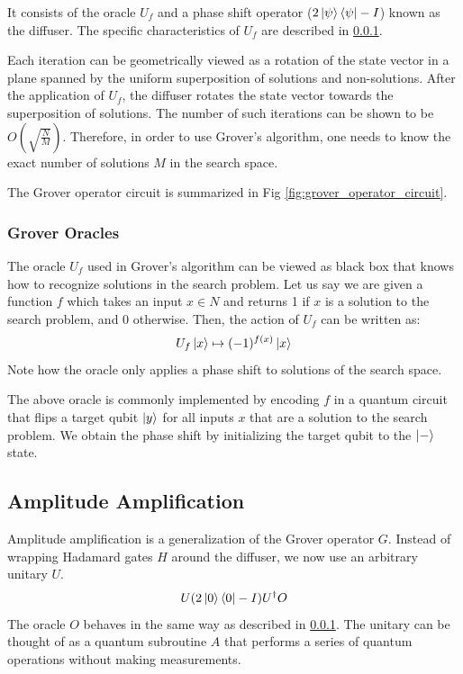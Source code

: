 \documentclass[10pt]{proc}
\theoremstyle{definition}
\theoremstyle{remark}
\begin{document}
It consists of the oracle $U_f$ and a phase shift operator
($2\ket{\psi}\bra{\psi} - I$) known as the diffuser. The specific
characteristics of $U_f$ are described in \ref{sec:grover_oracles}.

Each iteration can be geometrically viewed as a rotation of the state vector in
a plane spanned by the uniform superposition of solutions and non-solutions.
After the application of $U_f$, the diffuser rotates the state vector towards
the superposition of solutions. The number of such iterations can be shown to
be  $O(\sqrt{\frac{N}{M}})$. Therefore, in order to use Grover’s algorithm, one
needs to know the exact number of solutions $M$ in the search space.

The Grover operator circuit is summarized in Fig \ref{fig:grover_operator_circuit}.


\subsubsection{Grover Oracles} \label{sec:grover_oracles}

The oracle $U_f$ used in Grover’s algorithm can be viewed as black box that
knows how to recognize solutions in the search problem. Let us say we are given
a function $f$ which takes an input $x \in N$ and returns 1 if $x$ is a
solution to the search problem, and 0 otherwise. Then, the action of $U_f$ can
be written as:
\begin{equation}
  U_f\ket{x} \mapsto (-1)^{f(x)}\ket{x}
\end{equation}
Note how the oracle only applies a phase shift to solutions of the search
space. 

The above oracle is commonly implemented by encoding $f$ in a quantum circuit
that flips a target qubit $\ket{y}$ for all inputs $x$ that are a solution to the
search problem. We obtain the phase shift by initializing the target qubit to
the $\ket{-}$ state.

\subsection{Amplitude Amplification}

Amplitude amplification is a generalization of the Grover operator $G$. Instead
of wrapping Hadamard gates $H$ around the diffuser, we now use an arbitrary
unitary $U$.
\begin{equation}
  U(2\ket{0}\bra{0} - I)U^{\dagger}O
\end{equation}
The oracle $O$ behaves in the same way as described in \ref{sec:grover_oracles}.
The unitary can be thought of as a quantum subroutine $A$ that performs a
series of quantum operations without making measurements.
\end{document}

